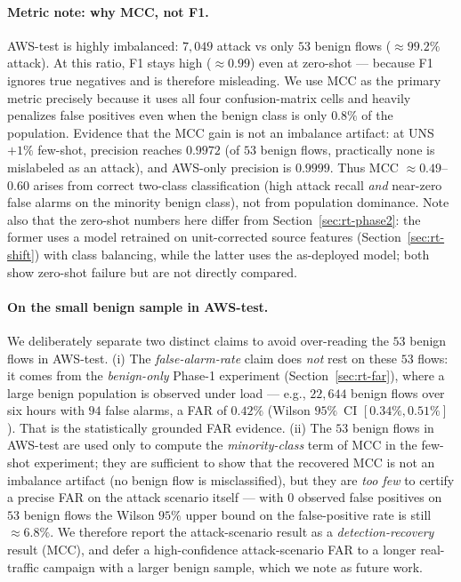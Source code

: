 \documentclass[preprint,12pt,authoryear]{elsarticle}
\begin{document}
\paragraph{Metric note: why MCC, not F1.} AWS-test is highly imbalanced: $7{,}049$
attack vs only $53$ benign flows ($\approx 99.2\%$ attack). At this ratio, F1 stays
high ($\approx 0.99$) even at zero-shot --- because F1 ignores true negatives and
is therefore misleading. We use MCC as the primary metric precisely because it
uses all four confusion-matrix cells and heavily penalizes false positives even
when the benign class is only $0.8\%$ of the population. Evidence that the MCC gain
is not an imbalance artifact: at UNS$+1\%$ few-shot, precision reaches $0.9972$
(of $53$ benign flows, practically none is mislabeled as an attack), and AWS-only
precision is $0.9999$. Thus MCC $\approx 0.49$--$0.60$ arises from correct
two-class classification (high attack recall \emph{and} near-zero false alarms on
the minority benign class), not from population dominance. Note also that the
zero-shot numbers here differ from Section~\ref{sec:rt-phase2}: the former uses a
model retrained on unit-corrected source features (Section~\ref{sec:rt-shift}) with
class balancing, while the latter uses the as-deployed model; both show zero-shot
failure but are not directly compared.

\paragraph{On the small benign sample in AWS-test.} We deliberately separate two
distinct claims to avoid over-reading the $53$ benign flows in AWS-test. (i) The
\emph{false-alarm-rate} claim does \emph{not} rest on these $53$ flows: it comes
from the \emph{benign-only} Phase-1 experiment (Section~\ref{sec:rt-far}), where a
large benign population is observed under load --- e.g., $22{,}644$ benign flows
over six hours with $94$ false alarms, a FAR of $0.42\%$ (Wilson $95\%$~CI
$[0.34\%, 0.51\%]$). That is the statistically grounded FAR evidence. (ii) The
$53$ benign flows in AWS-test are used only to compute the \emph{minority-class}
term of MCC in the few-shot experiment; they are sufficient to show that the
recovered MCC is not an imbalance artifact (no benign flow is misclassified), but
they are \emph{too few} to certify a precise FAR on the attack scenario itself ---
with $0$ observed false positives on $53$ benign flows the Wilson $95\%$ upper
bound on the false-positive rate is still $\approx 6.8\%$. We therefore report the
attack-scenario result as a \emph{detection-recovery} result (MCC), and defer a
high-confidence attack-scenario FAR to a longer real-traffic campaign with a
larger benign sample, which we note as future work.
\end{document}
